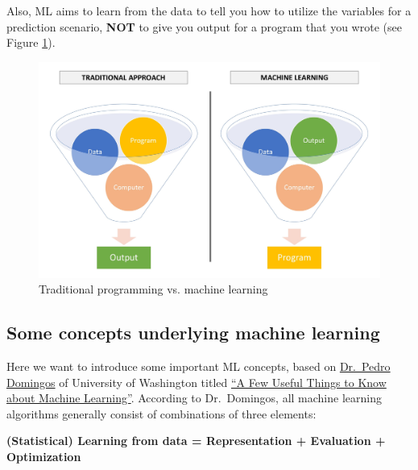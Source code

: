 \documentclass[]{book}
\begin{document}
Also, ML aims to learn from the data to tell you how to utilize the variables for a prediction scenario, \textbf{NOT} to give you output for a program that you wrote (see Figure \ref{fig:fig5-2}).

\begin{figure}
\includegraphics[width=1\linewidth]{images/traditional_ml} \caption{Traditional programming vs. machine learning}\label{fig:fig5-2}
\end{figure}

\hypertarget{some-concepts-underlying-machine-learning}{%
\subsection{Some concepts underlying machine learning}\label{some-concepts-underlying-machine-learning}}

Here we want to introduce some important ML concepts, based on \href{https://homes.cs.washington.edu/~pedrod/}{Dr.~Pedro Domingos} of University of Washington titled \href{https://homes.cs.washington.edu/~pedrod/papers/cacm12.pdf}{``A Few Useful Things to Know about Machine Learning''}. According to Dr.~Domingos, all machine learning algorithms generally consist of combinations of three elements:

\textbf{(Statistical) Learning from data = Representation + Evaluation + Optimization}
\end{document}
